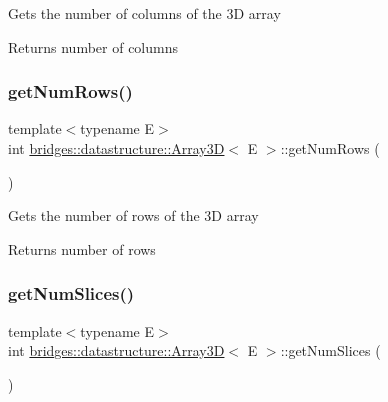 Gets the number of columns of the 3D array \begin{DoxyReturn}{Returns}
number of columns 
\end{DoxyReturn}
\mbox{\label{classbridges_1_1datastructure_1_1_array3_d_a73aebe1098512ca4196cb8da0eb493fe}} 
\subsubsection{\texorpdfstring{get\+Num\+Rows()}{getNumRows()}}
{\footnotesize\ttfamily template$<$typename E$>$ \\
int \mbox{\hyperlink{classbridges_1_1datastructure_1_1_array3_d}{bridges\+::datastructure\+::\+Array3D}}$<$ E $>$\+::get\+Num\+Rows (\begin{DoxyParamCaption}{ }\end{DoxyParamCaption})\hspace{0.3cm}{\ttfamily [inline]}}

Gets the number of rows of the 3D array \begin{DoxyReturn}{Returns}
number of rows 
\end{DoxyReturn}
\mbox{\label{classbridges_1_1datastructure_1_1_array3_d_ad2fb0a0b8be702944c25b6fc807263f7}} 
\subsubsection{\texorpdfstring{get\+Num\+Slices()}{getNumSlices()}}
{\footnotesize\ttfamily template$<$typename E$>$ \\
int \mbox{\hyperlink{classbridges_1_1datastructure_1_1_array3_d}{bridges\+::datastructure\+::\+Array3D}}$<$ E $>$\+::get\+Num\+Slices (\begin{DoxyParamCaption}{ }\end{DoxyParamCaption})\hspace{0.3cm}{\ttfamily [inline]}}

